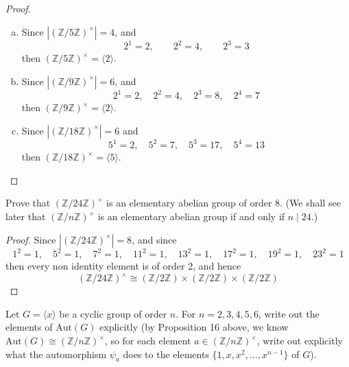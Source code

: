 \documentclass{article}
\newcommand{\Z}{\mathbb{Z}}
\newenvironment{problem}[2][Problem]{\begin{trivlist}
\item[\hskip \labelsep {\bfseries #1}\hskip \labelsep {\bfseries #2.}]}{\end{trivlist}}
\begin{document}
\begin{proof}\hspace{1pt}
    \begin{enumerate}[(a)]
        \item 
    Since $|(\Z/5\Z)^{\times}|=4$, and 
    \[
    2^1=2, \qquad 2^2=4, \qquad 2^3 =3
    \]
    then $(\Z/5\Z)^{\times}=\langle 2 \rangle$.
    \item Since $|(\Z/9\Z)^{\times}|=6$, and 
    \[
    2^1=2, \quad 2^2=4, \quad 2^3=8, \quad 2^4 =7
    \]
    then $(\Z/9\Z)^{\times}=\langle 2 \rangle$.
    \item Since $|(\Z/18\Z)^{\times}|=6$ and 
    \[
        5^1=2, \quad 5^2=7, \quad 5^3=17, \quad 5^4=13
    \]
    then $(\Z/18\Z)^{\times}=\langle 5 \rangle$.
    \end{enumerate}
\end{proof}
\begin{problem}{16}
    Prove that $(\mathbb{Z}/24\mathbb{Z})^\times$ is an elementary abelian group of order $8$. (We shall see later that $(\mathbb{Z}/n\mathbb{Z})^\times$ is an elementary abelian group if and only if $n \mid 24$.)
\end{problem}
\begin{proof}
    Since $|(\Z/24\Z)^{\times}|=8$, and since 
    \[
        1^2=1, \quad5^2=1, \quad 7^2=1, \quad 11^2=1, \quad 13^2=1, \quad 17^2=1, \quad 19^2=1,\quad 23^2=1
    \]
    then every non identity element is of order $2$, and hence \[
    (\Z/24\Z)^{\times}\cong (\Z/2\Z)\times (\Z/2\Z)\times (\Z/2\Z)
    \] 
\end{proof}
\begin{problem}{17}
 Let $G = \langle x \rangle$ be a cyclic group of order $n$. For $n = 2, 3, 4, 5, 6$, write out the elements of $\text{Aut}(G)$ explicitly (by Proposition 16 above, we know $\text{Aut}(G) \cong (\mathbb{Z}/n\mathbb{Z})^\times$, so for each element $a \in (\mathbb{Z}/n\mathbb{Z})^\times$, write out explicitly what the automorphism $\psi_a$ does to the elements $\{1, x, x^2, \dots, x^{n-1}\}$ of $G$).

\end{problem}
\end{document}
